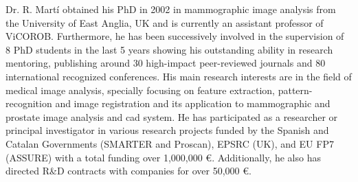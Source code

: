 Dr. R. Mart\'i obtained his PhD in 2002 in mammographic image analysis from the University of East Anglia, UK and is currently an assistant professor of ViCOROB.
Furthermore, he has been successively involved in the supervision of 8 PhD students in the last 5 years showing his outstanding ability in research mentoring, publishing around 30 high-impact peer-reviewed journals and 80 international recognized conferences.
His main research interests are in the field of medical image analysis, specially focusing on feature extraction, pattern-recognition and image registration and its application to mammographic and prostate image analysis and \ac{cad} system.
He has participated as a researcher or principal investigator in various research projects funded by the Spanish and Catalan Governments (SMARTER and Proscan), EPSRC (UK), and EU FP7 (ASSURE) with a total funding over 1,000,000 \euro{}.
Additionally, he also has directed R\&D contracts with companies for over 50,000 \euro{}.





